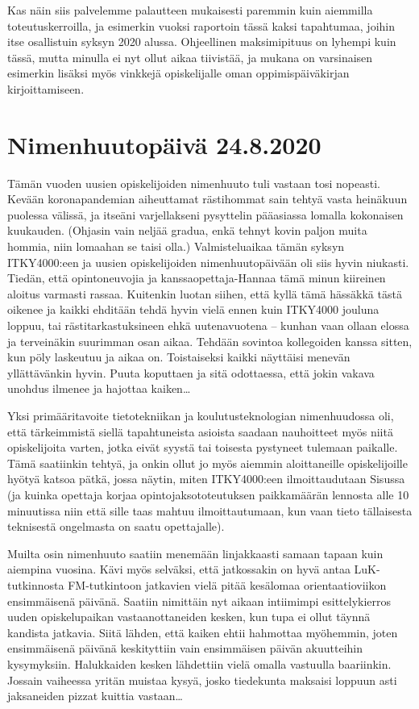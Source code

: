 \documentclass[utf8]{gradu3}
\begin{document}
Kas näin siis palvelemme palautteen mukaisesti paremmin kuin aiemmilla
toteutuskerroilla, ja esimerkin vuoksi raportoin tässä kaksi tapahtumaa, joihin
itse osallistuin syksyn 2020 alussa. Ohjeellinen maksimipituus on lyhempi kuin
tässä, mutta minulla ei nyt ollut aikaa tiivistää, ja mukana on varsinaisen
esimerkin lisäksi myös vinkkejä opiskelijalle oman oppimispäiväkirjan
kirjoittamiseen.

\section{Nimenhuutopäivä 24.8.2020}
Tämän vuoden uusien opiskelijoiden nimenhuuto tuli vastaan tosi nopeasti. Kevään
koronapandemian aiheuttamat rästihommat sain tehtyä vasta heinäkuun puolessa
välissä, ja itseäni varjellakseni pysyttelin pääasiassa lomalla kokonaisen
kuukauden. (Ohjasin vain neljää gradua, enkä tehnyt kovin paljon muita hommia,
niin lomaahan se taisi olla.) Valmisteluaikaa tämän syksyn ITKY4000:een ja
uusien opiskelijoiden nimenhuutopäivään oli siis hyvin niukasti. Tiedän, että
opintoneuvojia ja kanssaopettaja-Hannaa tämä minun kiireinen aloitus varmasti
rassaa. Kuitenkin luotan siihen, että kyllä tämä hässäkkä tästä oikenee ja
kaikki ehditään tehdä hyvin vielä ennen kuin ITKY4000 jouluna loppuu, tai
rästitarkastuksineen ehkä uutenavuotena – kunhan vaan ollaan elossa ja
terveinäkin suurimman osan aikaa. Tehdään sovintoa kollegoiden kanssa sitten,
kun pöly laskeutuu ja aikaa on. Toistaiseksi kaikki näyttäisi menevän
yllättävänkin hyvin. Puuta koputtaen ja sitä odottaessa, että jokin vakava
unohdus ilmenee ja hajottaa kaiken\ldots

Yksi primääritavoite tietotekniikan ja koulutusteknologian nimenhuudossa oli,
että tärkeimmistä siellä tapahtuneista asioista saadaan nauhoitteet myös niitä
opiskelijoita varten, jotka eivät syystä tai toisesta pystyneet tulemaan
paikalle. Tämä saatiinkin tehtyä, ja onkin ollut jo myös aiemmin aloittaneille
opiskelijoille hyötyä katsoa pätkä, jossa näytin, miten ITKY4000:een
ilmoittaudutaan Sisussa (ja kuinka opettaja korjaa opintojaksototeutuksen
paikkamäärän lennosta alle 10 minuutissa niin että sille taas mahtuu
ilmoittautumaan, kun vaan tieto tällaisesta teknisestä ongelmasta on saatu
opettajalle).

Muilta osin nimenhuuto saatiin menemään linjakkaasti samaan tapaan kuin aiempina
vuosina. Kävi myös selväksi, että jatkossakin on hyvä antaa LuK-tutkinnosta
FM-tutkintoon jatkavien vielä pitää kesälomaa orientaatioviikon ensimmäisenä
päivänä. Saatiin nimittäin nyt aikaan intiimimpi esittelykierros uuden
opiskelupaikan vastaanottaneiden kesken, kun tupa ei ollut täynnä kandista
jatkavia. Siitä lähden, että kaiken ehtii hahmottaa myöhemmin, joten
ensimmäisenä päivänä keskityttiin vain ensimmäisen päivän akuutteihin
kysymyksiin. Halukkaiden kesken lähdettiin vielä omalla vastuulla baariinkin.
Jossain vaiheessa yritän muistaa kysyä, josko tiedekunta maksaisi loppuun asti
jaksaneiden pizzat kuittia vastaan\ldots
\end{document}
